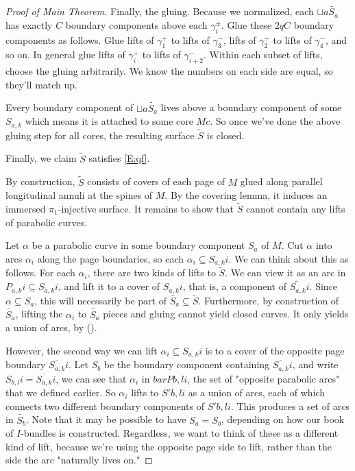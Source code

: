 \documentclass[12pt]{amsart}
\theoremstyle{definition}
\theoremstyle{remark}
\newcommand{\cin}{\subseteq}
\begin{document}
\begin{proof}[Proof of Main Theorem]
Finally, the gluing. Because we normalized, each $\sqcup a \widetilde{S_a}$ has
exactly $C$ boundary components above each $\gamma_i^\pm$.  Glue these $2qC$
boundary components as follows. Glue lifts of $\gamma_1^+$ to lifts of
$\gamma_3^-$, lifts of $\gamma_2^+$ to lifts of $\gamma_4^-$, and so on. In
general glue lifts of $\gamma_i^+$ to lifts of $\gamma_{i+2}^-$. Within each
subset of lifts, choose the gluing arbitrarily. We know the numbers on each
side are equal, so they'll match up.

Every boundary component of $\sqcup a \widetilde{S_a}$ lives above a boundary component
of some $S_{a,k}$ which means it is attached to some core $Mc$. So once we've done
the above gluing step for all cores, the resulting surface $\widetilde{S}$ is closed.


Finally, we claim $\widetilde{S}$ satisfies \eqref{E:qf}.


By construction, $\widetilde{S}$ consists of covers of each page of $M$ glued along
parallel longitudinal annuli at the spines of $M$. By the covering lemma, it
induces an immersed $\pi_1$-injective surface. It remains to show that
$\widetilde{S}$ cannot contain any lifts of parabolic curves.

Let $\alpha$ be a parabolic curve in some boundary component $S_a$ of $M$. Cut
$\alpha$ into arcs $\alpha_i$ along the page boundaries, so each $\alpha_i \cin
S_{a,k}i$.  We can think about this as follows. For each $\alpha_i$, there are two
kinds of lifts to $\widetilde{S}$. We can view it as an arc in $P_{a,k}i \cin
S_{a,k}i$, and lift it to a cover of $S_{a,k}i$, that is, a component of
$\widetilde{S_{a,k}}i$. Since $\alpha \cin S_a$, this will necessarily be part
of $\widetilde{S_a} \cin \widetilde{S}$. Furthermore, by construction of
$\widetilde{S_a}$, lifting the $\alpha_i$ to $\widetilde{S_a}$ pieces and
gluing cannot yield closed curves.  It only yields a union of arcs, by (\dag).

However, the second way we can lift $\alpha_i \cin S_{a,k}i$ is to a cover of the
opposite page boundary $\overline{S_{a,k}}i$. Let $S_b$ be the boundary component
containing $\overline{S_{a,k}}i$, and write $S_{b,l}i = \overline{S_{a,k}}i$, we can see that $\alpha_i$
in $barPb,li$, the set of "opposite parabolic arcs" that we defined earlier.
So $\alpha_i$ lifts to $S'b,li$ as a union of arcs, each of which connects two
different boundary components of $S'b,li$. This produces a set of arcs in
$\widetilde{S_b}$. Note that it may be possible to have $S_a = S_b$, depending on
how our book of $I$-bundles is constructed.  Regardless, we want to think of
these as a different kind of lift, because we're using the opposite page side
to lift, rather than the side the arc "naturally lives on."


\end{proof}
\end{document}
